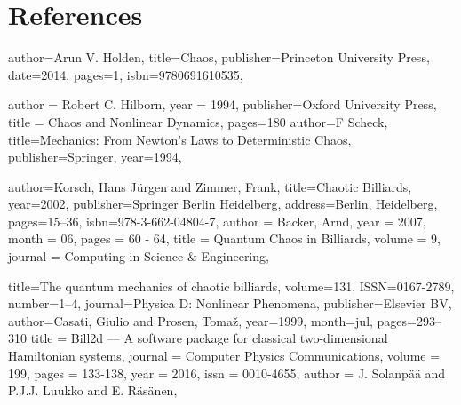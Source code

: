 \documentclass[12pt,a4paper]{amsart}
\begin{document}
\section*{References} 
\begin{biblist}
    {
      author={Arun V. Holden},
      title={Chaos},
      publisher={Princeton University Press},
      date={2014},
      pages={1},
      isbn={9780691610535},
    }
    
        {
        author = {Robert C. Hilborn},
        year = {1994},
        publisher={Oxford University Press},
        title = {Chaos and Nonlinear Dynamics},
        pages={180}
        }
        {
        author={F Scheck},
        title={Mechanics: From Newton's Laws to Deterministic Chaos},
        publisher={Springer},
        year={1994}, 
        }

        {
        author={Korsch, Hans J{\"u}rgen
        and Zimmer, Frank},
        title={Chaotic Billiards},
        year={2002},
        publisher={Springer Berlin Heidelberg},
        address={Berlin, Heidelberg},
        pages={15--36},
        isbn={978-3-662-04804-7},
        }
        {
        author = {Backer, Arnd},
        year = {2007},
        month = {06},
        pages = {60 - 64},
        title = {Quantum Chaos in Billiards},
        volume = {9},
        journal = {Computing in Science \& Engineering},
        }

    {
        title={The quantum mechanics of chaotic billiards},
       volume={131},
       ISSN={0167-2789},
       number={1–4},
       journal={Physica D: Nonlinear Phenomena},
       publisher={Elsevier BV},
       author={Casati, Giulio and Prosen, Tomaž},
       year={1999},
       month=jul, pages={293–310} 
   }
    {
        title = {Bill2d — A software package for classical two-dimensional Hamiltonian systems},
        journal = {Computer Physics Communications},
        volume = {199},
        pages = {133-138},
        year = {2016},
        issn = {0010-4655},
        author = {J. Solanpää and P.J.J. Luukko and E. Räsänen},
    }


   

\end{biblist}
\end{document}
